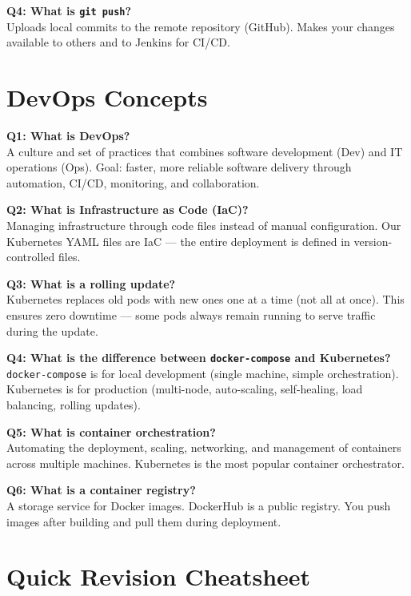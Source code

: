 \documentclass[12pt,a4paper]{article}
\begin{document}
\textbf{Q4: What is \texttt{git push}?}\\
Uploads local commits to the remote repository (GitHub). Makes your changes available to others and to Jenkins for CI/CD.

\section{DevOps Concepts}

\textbf{Q1: What is DevOps?}\\
A culture and set of practices that combines software development (Dev) and IT operations (Ops). Goal: faster, more reliable software delivery through automation, CI/CD, monitoring, and collaboration.

\textbf{Q2: What is Infrastructure as Code (IaC)?}\\
Managing infrastructure through code files instead of manual configuration. Our Kubernetes YAML files are IaC --- the entire deployment is defined in version-controlled files.

\textbf{Q3: What is a rolling update?}\\
Kubernetes replaces old pods with new ones one at a time (not all at once). This ensures zero downtime --- some pods always remain running to serve traffic during the update.

\textbf{Q4: What is the difference between \texttt{docker-compose} and Kubernetes?}\\
\texttt{docker-compose} is for local development (single machine, simple orchestration). Kubernetes is for production (multi-node, auto-scaling, self-healing, load balancing, rolling updates).

\textbf{Q5: What is container orchestration?}\\
Automating the deployment, scaling, networking, and management of containers across multiple machines. Kubernetes is the most popular container orchestrator.

\textbf{Q6: What is a container registry?}\\
A storage service for Docker images. DockerHub is a public registry. You push images after building and pull them during deployment.

\section{Quick Revision Cheatsheet}
\end{document}
